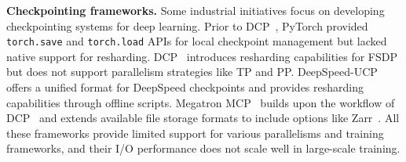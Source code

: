 \noindent \textbf{Checkpointing frameworks.} %
Some industrial initiatives focus on developing checkpointing systems for deep learning. Prior to DCP~\cite{torch-dcp}, PyTorch provided \texttt{torch.save} and \texttt{torch.load} APIs for local checkpoint management but lacked native support for resharding. DCP~\cite{torch-dcp} introduces resharding capabilities for FSDP but does not support %
parallelism strategies like TP and PP. DeepSpeed-UCP~\cite{ucp} offers a unified format for DeepSpeed checkpoints and provides resharding capabilities through offline scripts. Megatron MCP~\cite{megatron-dcp} builds upon the workflow of DCP~\cite{torch-dcp} and extends available file storage formats to include options like Zarr~\cite{Zarr}. %
All these frameworks %
provide limited support for various parallelisms and training frameworks, %
and their I/O performance does not scale well in large-scale training.  %

